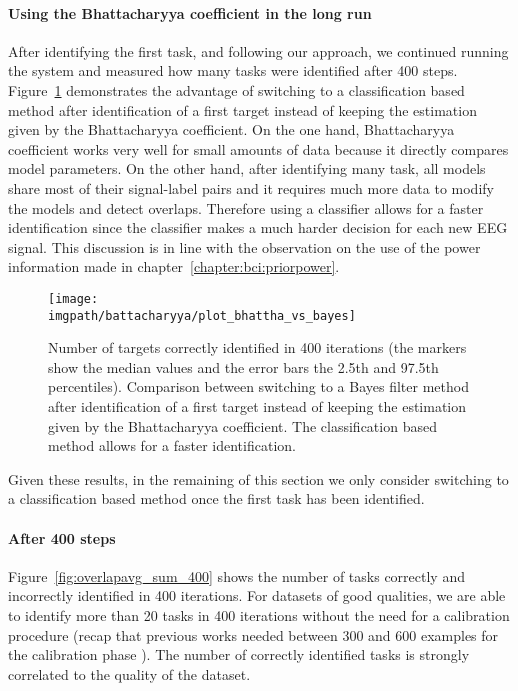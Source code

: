\paragraph{Using the Bhattacharyya coefficient in the long run}

After identifying the first task, and following our approach, we continued running the system and measured how many tasks were identified after 400 steps. Figure~\ref{fig:overlapbhatta} demonstrates the advantage of switching to a classification based method after identification of a first target instead of keeping the estimation given by the Bhattacharyya coefficient. On the one hand, Bhattacharyya coefficient works very well for small amounts of data because it directly compares model parameters. On the other hand, after identifying many task, all models share most of their signal-label pairs and it requires much more data to modify the models and detect overlaps. Therefore using a classifier allows for a faster identification since the classifier makes a much harder decision for each new EEG signal. This discussion is in line with the observation on the use of the power information made in chapter~\ref{chapter:bci:priorpower}.

\begin{figure}[!ht]
    \centering
        \texttt{[image: \\imgpath/battacharyya/plot\_bhattha\_vs\_bayes]}
        \caption{Number of targets correctly identified in 400 iterations (the markers show the median values and the error bars the 2.5th and 97.5th percentiles). Comparison between switching to a Bayes filter method after identification of a first target instead of keeping the estimation given by the Bhattacharyya coefficient. The classification based method allows for a faster identification.}
        \label{fig:overlapbhatta}
\end{figure} 

Given these results, in the remaining of this section we only consider switching to a classification based method once the first task has been identified.

\paragraph{After 400 steps}

Figure~\ref{fig:overlapavg_sum_400} shows the number of tasks correctly and incorrectly identified in 400 iterations. For datasets of good qualities, we are able to identify more than 20 tasks in 400 iterations without the need for a calibration procedure (recap that previous works needed between 300 and 600 examples for the calibration phase \cite{chavarriaga2010learning,iturrate2010single}). The number of correctly identified tasks is strongly correlated to the quality of the dataset.

